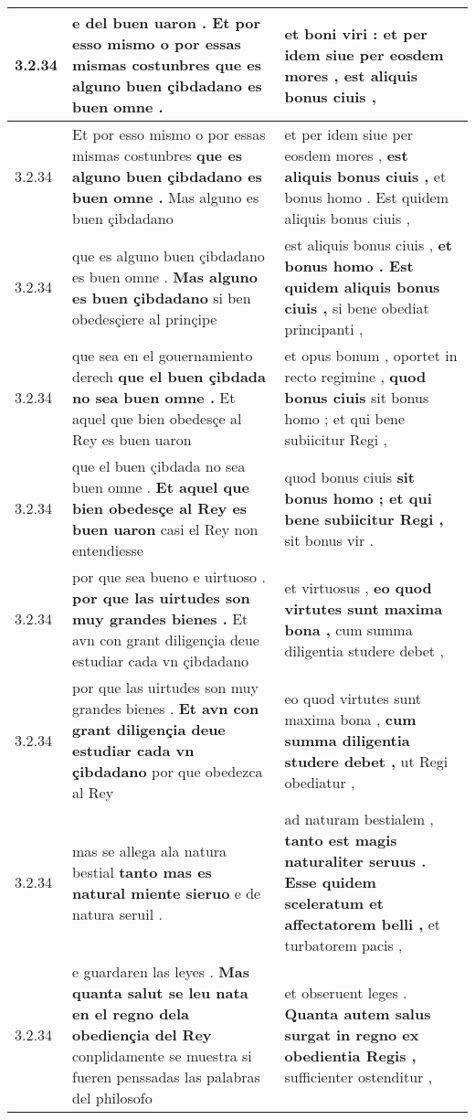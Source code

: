 \begin{tabular}{|p{1cm}|p{6.5cm}|p{6.5cm}|}
3.2.34 & e del buen uaron . \textbf{ Et por esso mismo o por essas mismas costunbres } que es alguno buen çibdadano es buen omne . & et boni viri : \textbf{ et per idem siue per eosdem mores , } est aliquis bonus ciuis , \\\hline
3.2.34 & Et por esso mismo o por essas mismas costunbres \textbf{ que es alguno buen çibdadano es buen omne . } Mas alguno es buen çibdadano & et per idem siue per eosdem mores , \textbf{ est aliquis bonus ciuis , } et bonus homo . Est quidem aliquis bonus ciuis , \\\hline
3.2.34 & que es alguno buen çibdadano es buen omne . \textbf{ Mas alguno es buen çibdadano } si ben obedesçiere al prinçipe & est aliquis bonus ciuis , \textbf{ et bonus homo . Est quidem aliquis bonus ciuis , } si bene obediat principanti , \\\hline
3.2.34 & que sea en el gouernamiento derech \textbf{ que el buen çibdada no sea buen omne . } Et aquel que bien obedesçe al Rey es buen uaron & et opus bonum , oportet in recto regimine , \textbf{ quod bonus ciuis } sit bonus homo ; et qui bene subiicitur Regi , \\\hline
3.2.34 & que el buen çibdada no sea buen omne . \textbf{ Et aquel que bien obedesçe al Rey es buen uaron } casi el Rey non entendiesse & quod bonus ciuis \textbf{ sit bonus homo ; et qui bene subiicitur Regi , } sit bonus vir . \\\hline
3.2.34 & por que sea bueno e uirtuoso . \textbf{ por que las uirtudes son muy grandes bienes . } Et avn con grant diligençia deue estudiar cada vn çibdadano & et virtuosus , \textbf{ eo quod virtutes sunt maxima bona , } cum summa diligentia studere debet , \\\hline
3.2.34 & por que las uirtudes son muy grandes bienes . \textbf{ Et avn con grant diligençia deue estudiar cada vn çibdadano } por que obedezca al Rey & eo quod virtutes sunt maxima bona , \textbf{ cum summa diligentia studere debet , } ut Regi obediatur , \\\hline
3.2.34 & mas se allega ala natura bestial \textbf{ tanto mas es natural miente sieruo } e de natura seruil . & ad naturam bestialem , \textbf{ tanto est magis naturaliter seruus . Esse quidem sceleratum et affectatorem belli , } et turbatorem pacis , \\\hline
3.2.34 & e guardaren las leyes . \textbf{ Mas quanta salut se leu nata en el regno dela obediençia del Rey } conplidamente se muestra si fueren penssadas las palabras del philosofo & et obseruent leges . \textbf{ Quanta autem salus surgat in regno ex obedientia Regis , } sufficienter ostenditur , \\\hline

\end{tabular}
